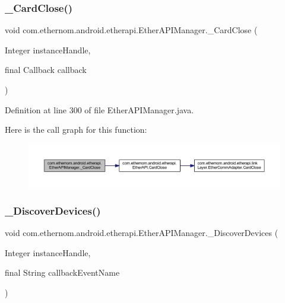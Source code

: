 \subsubsection{\texorpdfstring{\+\_\+\+Card\+Close()}{\_CardClose()}}
{\footnotesize\ttfamily void com.\+ethernom.\+android.\+etherapi.\+Ether\+A\+P\+I\+Manager.\+\_\+\+Card\+Close (\begin{DoxyParamCaption}\item[{Integer}]{instance\+Handle,  }\item[{final Callback}]{callback }\end{DoxyParamCaption})}



Definition at line 300 of file Ether\+A\+P\+I\+Manager.\+java.

Here is the call graph for this function\+:\nopagebreak
\begin{figure}[H]
\begin{center}
\leavevmode
\includegraphics[width=350pt]{classcom_1_1ethernom_1_1android_1_1etherapi_1_1_ether_a_p_i_manager_a362db698578b23502acc6e72caa7e4a6_cgraph}
\end{center}
\end{figure}
\mbox{\label{classcom_1_1ethernom_1_1android_1_1etherapi_1_1_ether_a_p_i_manager_a69b7979615788985439523c1ee64662a}} 
\subsubsection{\texorpdfstring{\+\_\+\+Discover\+Devices()}{\_DiscoverDevices()}}
{\footnotesize\ttfamily void com.\+ethernom.\+android.\+etherapi.\+Ether\+A\+P\+I\+Manager.\+\_\+\+Discover\+Devices (\begin{DoxyParamCaption}\item[{Integer}]{instance\+Handle,  }\item[{final String}]{callback\+Event\+Name }\end{DoxyParamCaption})}



